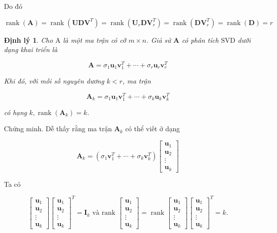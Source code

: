 \documentclass[12pt,a4paper,oneside]{report}
\newtheorem{dl}{Định lý}[section]
\numberwithin{equation}{section}
\begin{document}
Do đó

$$
\operatorname{rank}(\mathbf{A})=\operatorname{rank}\left(\mathbf{U D V}^{T}\right)=\operatorname{rank}\left(\mathbf{U}_{r} \mathbf{D} \mathbf{V}_{r}^{T}\right)=\operatorname{rank}\left(\mathbf{D V}_{r}^{T}\right)=\operatorname{rank}(\mathbf{D})=r
$$


\begin{dl} 
Cho $\mathrm{A}$ là một ma trận có cỡ $m \times n$. Giả sử $\mathbf{A}$ có phân tích $\mathrm{SVD}$ dưới dạng khai triển là

$$
\mathbf{A}=\sigma_{1} \mathbf{u}_{1} \mathbf{v}_{1}^{T}+\cdots+\sigma_{r} \mathbf{u}_{r} \mathbf{v}_{r}^{T}
$$

Khi đó, với mỗi số nguyên dương $k<r$, ma trận

$$
\mathbf{A}_{k}=\sigma_{1} \mathbf{u}_{1} \mathbf{v}_{1}^{T}+\cdots+\sigma_{k} \mathbf{u}_{k} \mathbf{v}_{k}^{T}
$$

có hạng $k, \operatorname{rank}\left(\mathbf{A}_{k}\right)=k$.
\end{dl}
Chứng minh. Dễ thấy rằng ma trận $\mathbf{A}_{k}$ có thể viết ở dạng

$$
\mathbf{A}_{k}=\left(\sigma_{1} \mathbf{v}_{1}^{T}+\cdots+\sigma_{k} \mathbf{v}_{k}^{T}\right)\left[\begin{array}{c}
	\mathbf{u}_{1} \\
	\mathbf{u}_{2} \\
	\vdots \\
	\mathbf{u}_{k}
\end{array}\right]
$$

Ta có

$$
\left[\begin{array}{c}
	\mathbf{u}_{1} \\
	\mathbf{u}_{2} \\
	\vdots \\
	\mathbf{u}_{k}
\end{array}\right]\left[\begin{array}{c}
	\mathbf{u}_{1} \\
	\mathbf{u}_{2} \\
	\vdots \\
	\mathbf{u}_{k}
\end{array}\right]^{T}=\mathbf{I}_{k} \text { và rank }\left[\begin{array}{c}
	\mathbf{u}_{1} \\
	\mathbf{u}_{2} \\
	\vdots \\
	\mathbf{u}_{k}
\end{array}\right]=\operatorname{rank}\left[\begin{array}{c}
	\mathbf{u}_{1} \\
	\mathbf{u}_{2} \\
	\vdots \\
	\mathbf{u}_{k}
\end{array}\right]\left[\begin{array}{c}
	\mathbf{u}_{1} \\
	\mathbf{u}_{2} \\
	\vdots \\
	\mathbf{u}_{k}
\end{array}\right]^{T}=k .
$$
\end{document}
